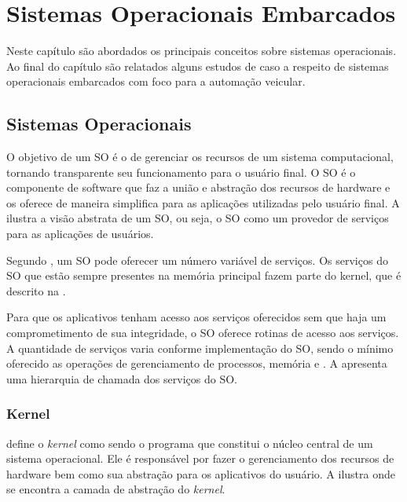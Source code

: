 \chapter{Sistemas Operacionais Embarcados}

Neste capítulo são abordados os principais conceitos sobre sistemas operacionais. Ao final do capítulo são relatados alguns estudos de caso a respeito de sistemas operacionais embarcados com foco para a automação veicular.

\section{Sistemas Operacionais}

O objetivo de um SO é o de gerenciar os recursos de um sistema computacional, tornando transparente seu funcionamento para o usuário final. O SO é o componente de software que faz a união e abstração dos recursos de hardware e os oferece de maneira simplifica para as aplicações utilizadas pelo usuário final. A  ilustra a visão abstrata de um SO, ou seja, o SO como um provedor de serviços para as aplicações de usuários.


Segundo , um SO pode oferecer um número variável de serviços. Os serviços do SO que estão sempre presentes na memória principal fazem parte do kernel, que é descrito na . 

Para que os aplicativos tenham acesso aos serviços oferecidos sem que haja um comprometimento de sua integridade, o SO oferece rotinas de acesso aos serviços. A quantidade de serviços varia conforme implementação do SO, sendo o mínimo oferecido as operações de gerenciamento de processos, memória e . A  apresenta uma hierarquia de chamada dos serviços do SO.


\subsection{Kernel}
\label{cap:os_kernel}

 define o \emph{kernel} como sendo o programa que constitui o núcleo central de um sistema operacional. Ele é responsável por fazer o gerenciamento dos recursos de hardware bem como sua abstração para os aplicativos do usuário. A  ilustra onde se encontra a camada de abstração do \emph{kernel}.

